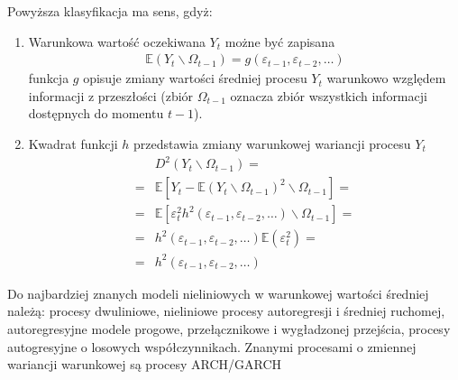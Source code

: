 Powyższa klasyfikacja ma sens, gdyż:
\begin{enumerate}
\item Warunkowa wartość oczekiwana $ Y_t $ możne być zapisana
\begin{gather*}
\mathbb E \left(Y_t\backslash\Omega_{t-1}\right)=g\left (\varepsilon_{t-1},\varepsilon_{t-2},\dots \right)
\end{gather*}
funkcja $ g $ opisuje zmiany wartości średniej procesu $ Y_t $ warunkowo względem informacji z przeszłości (zbiór $ \Omega_{t-1} $ oznacza zbiór wszystkich informacji dostępnych do momentu $ t-1 $).
\item Kwadrat funkcji $ h $ przedstawia zmiany warunkowej wariancji procesu $ Y_t $
\begin{align*}
&D^2\left(Y_t\backslash\Omega_{t-1}\right)
=\\=&
\mathbb E \left[Y_t-\mathbb E \left(Y_t\backslash\Omega_{t-1}\right)^2\backslash\Omega_{t-1}\right]
=\\=&
\mathbb E \left[\varepsilon_t^2 h^2\left (\varepsilon_{t-1},\varepsilon_{t-2},\dots \right)\backslash\Omega_{t-1}\right]
=\\=&
h^2\left (\varepsilon_{t-1},\varepsilon_{t-2},\dots \right)\mathbb E \left(\varepsilon_t^2 \right)
=\\=&
h^2\left (\varepsilon_{t-1},\varepsilon_{t-2},\dots \right)
\end{align*}
\end{enumerate}
Do najbardziej znanych modeli nieliniowych w warunkowej wartości średniej należą: procesy dwuliniowe, nieliniowe procesy autoregresji i średniej ruchomej, autoregresyjne modele progowe, przełącznikowe i wygładzonej przejścia, procesy autogresyjne o losowych współczynnikach. Znanymi procesami o zmiennej wariancji warunkowej są procesy ARCH/GARCH